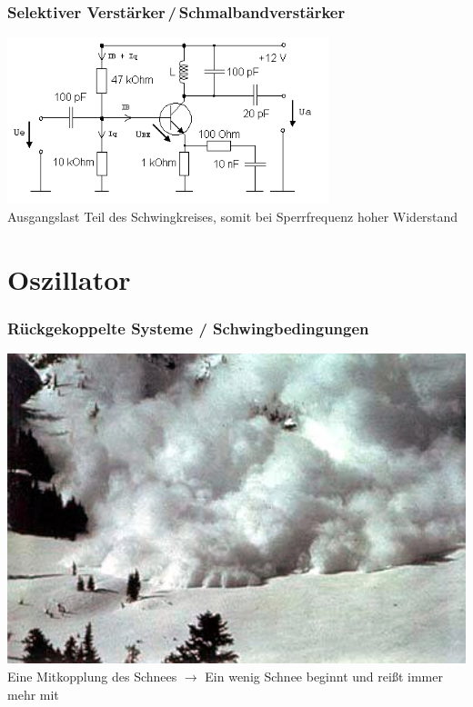 \begin{frame}
  \frametitle{Selektiver Verstärker\,/\,Schmalbandverstärker}
  \begin{center}
    \includegraphics[width=0.7\textwidth,height=.6\textheight,keepaspectratio]{a07/Selektiver_Verstarker.png}
    {\tiny \hyperlink{refs}{\cite{wm}}} \\[2em]
    Ausgangslast Teil des Schwingkreises, somit bei Sperrfrequenz hoher Widerstand
  \end{center}
\end{frame}

\section*{Oszillator}

\begin{frame}
  \frametitle{Rückgekoppelte Systeme / Schwingbedingungen}
  \begin{center}
    \includegraphics[width=1\textwidth,height=.6\textheight,keepaspectratio]{a07/Lawine.jpg}
    {\tiny \hyperlink{refs}{\cite{wm}}} \\[2em]
    Eine Mitkopplung des Schnees $\rightarrow$ Ein wenig Schnee beginnt und reißt immer mehr mit
  \end{center}
\end{frame}

